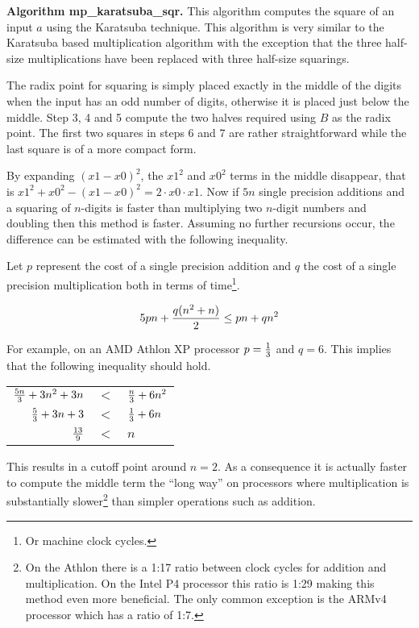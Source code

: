\documentclass[b5paper]{book}
\begin{document}
\textbf{Algorithm mp\_karatsuba\_sqr.}
This algorithm computes the square of an input $a$ using the Karatsuba technique.  This algorithm is very similar to the Karatsuba based
multiplication algorithm with the exception that the three half-size multiplications have been replaced with three half-size squarings.

The radix point for squaring is simply placed exactly in the middle of the digits when the input has an odd number of digits, otherwise it is
placed just below the middle.  Step 3, 4 and 5 compute the two halves required using $B$
as the radix point.  The first two squares in steps 6 and 7 are rather straightforward while the last square is of a more compact form.

By expanding $\left (x1 - x0 \right )^2$, the $x1^2$ and $x0^2$ terms in the middle disappear, that is $x1^2 + x0^2 - (x1 - x0)^2 = 2 \cdot x0 \cdot x1$.
Now if $5n$ single precision additions and a squaring of $n$-digits is faster than multiplying two $n$-digit numbers and doubling then
this method is faster.  Assuming no further recursions occur, the difference can be estimated with the following inequality.

Let $p$ represent the cost of a single precision addition and $q$ the cost of a single precision multiplication both in terms of time\footnote{Or
machine clock cycles.}. 

\begin{equation}
5pn +{{q(n^2 + n)} \over 2} \le pn + qn^2
\end{equation}

For example, on an AMD Athlon XP processor $p = {1 \over 3}$ and $q = 6$.  This implies that the following inequality should hold.
\begin{center}
\begin{tabular}{rcl}
${5n \over 3} + 3n^2 + 3n$     & $<$ & ${n \over 3} + 6n^2$ \\
${5 \over 3} + 3n + 3$     & $<$ & ${1 \over 3} + 6n$ \\
${13 \over 9}$     & $<$ & $n$ \\
\end{tabular}
\end{center}

This results in a cutoff point around $n = 2$.  As a consequence it is actually faster to compute the middle term the ``long way'' on processors
where multiplication is substantially slower\footnote{On the Athlon there is a 1:17 ratio between clock cycles for addition and multiplication.  On
the Intel P4 processor this ratio is 1:29 making this method even more beneficial.  The only common exception is the ARMv4 processor which has a
ratio of 1:7.  } than simpler operations such as addition.  
\end{document}
